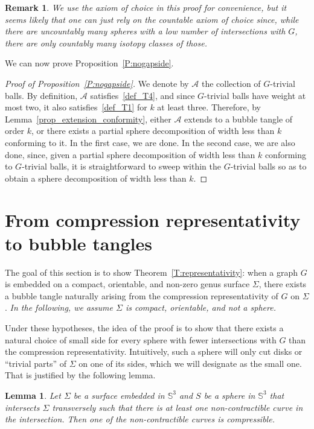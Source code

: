 \documentclass[11pt,a4paper]{article}
\newcommand{\Sp}{\mathbb S}
\newtheorem{remark}[theorem]{Remark}
\newtheorem{lem}[theorem]{Lemma}
\begin{document}
\begin{remark}
We use the axiom of choice in this proof for convenience, but it seems likely that one can just rely on the countable axiom of choice since, while there are uncountably many spheres with a low number of intersections with $G$, there are only countably many isotopy classes of those.
\end{remark}

We can now prove Proposition~\ref{P:nogapside}.

\begin{proof}[Proof of Proposition~\ref{P:nogapside}]
We denote by $\mathcal{A}$ the collection of $G$-trivial balls. By definition, $\mathcal{A}$ satisfies~\ref{def_T4}, and since $G$-trivial balls have weight at most two, it also satisfies~\ref{def_T1} for $k$ at least three. Therefore, by Lemma~\ref{prop_extension_conformity}, either $\mathcal{A}$ extends to a bubble tangle of order $k$, or there exists a partial sphere decomposition of width less than $k$ conforming to it. In the first case, we are done. In the second case, we are also done, since, given a partial sphere decomposition of width less than $k$ conforming to $G$-trivial balls, it is straightforward to sweep within the $G$-trivial balls so as to obtain a sphere decomposition of width less than $k$.
\end{proof}


\section{From compression representativity to bubble tangles}\label{S:representativity}

The goal of this section is to show Theorem~\ref{T:representativity}: when a graph $G$ is embedded on a compact, orientable, and non-zero genus surface $\Sigma$, there exists a bubble tangle naturally arising from the compression representativity of $G$ on $\Sigma$. \textit{In the following, we assume $\Sigma$ is compact, orientable, and not a sphere.}

Under these hypotheses, the idea of the proof is to show that there exists a natural choice of small side for every sphere with fewer intersections with $G$ than the compression representativity. Intuitively, such a sphere will only cut disks or ``trivial parts'' of $\Sigma$ on one of its sides, which we will designate as the small one. That is justified by the following lemma.

\begin{lem}\label{lem_sphere_compressible}
Let $\Sigma$ be a surface embedded in $\Sp^3$ and $S$ be a sphere in $\Sp^3$ that intersects $\Sigma$ transversely such that there is at least one non-contractible curve in the intersection. Then one of the non-contractible curves is compressible. 
\end{lem}
\end{document}
